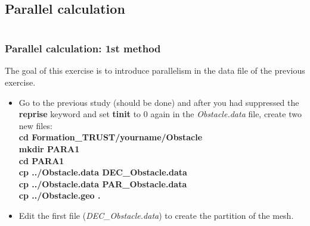 \documentclass[10pt, hyperref={unicode=true,pdfusetitle, bookmarks=true,bookmarksnumbered=false,bookmarksopen=false, breaklinks=false,pdfborder={0 0 1},backref=true,colorlinks=true,linkcolor=darkblue,pageanchor}]{beamer}
\begin{document}
\subsection{Parallel calculation} \label{exo_para_1}
\begin{frame}
\begin{columns}[c] 
\tableofcontents[sections={1-9},currentsection, currentsubsection]
\tableofcontents[sections={10-16},currentsection, currentsubsection]
\end{columns}
\end{frame}
\begin{frame}
\frametitle{Parallel calculation: 1st method}
\begin{block}{}

The goal of this exercise is to introduce parallelism in the data file of the previous exercise.

\begin{itemize}
\item Go to the previous study (should be done) and after you had suppressed the \textbf{reprise} keyword and set \textbf{tinit} to 0 again in the \textit{Obstacle.data} file, create two new files:\\
\textbf{cd Formation\_TRUST/yourname/Obstacle} \\
\textbf{mkdir PARA1} \\
\textbf{cd PARA1} \\
\textbf{cp ../Obstacle.data DEC\_Obstacle.data} \\
\textbf{cp ../Obstacle.data PAR\_Obstacle.data} \\
\textbf{cp ../Obstacle.geo .}\\
\vspace{0.3cm}
\item Edit the first file (\textit{DEC\_Obstacle.data}) to create the partition of the mesh.
\end{itemize}

\end{block}
\end{frame}
\end{document}
